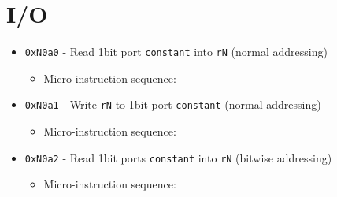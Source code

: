 \documentclass{article}
\def\pkptrout{\Verb|0202| - output *\Verb|pk| to data bus}
\def\incrementpk{\Verb|0502| - increment \Verb|pk|}
\def\regtodata#1{\Verb|#1003| - output \Verb|r#1| to data bus}
\def\datatoreg#1{\Verb|#1403| - write to \Verb|r#1| from data bus}
\def\echodataaddr{\Verb|0021| - echo data bus to addr bus for 3 cycles}
\def\readbitport  {\Verb|00a0| - read 1bit port \Verb|addr| (normal addressing) to the data line}
\def\writebitport {\Verb|00a1| - write data line to 1bit port \Verb|addr| (normal addressing)}
\def\readbitportb {\Verb|00a2| - read 1bit port \Verb|addr| (bitwise addressing) to the data line}
\def\done{\Verb|fffe| - end instruction}
\begin{document}
\section{I/O}
\begin{itemize}
    \item \Verb|0xN0a0| - Read 1bit port \Verb|constant| into \Verb|rN| (normal addressing)
    \begin{itemize}
        \item Micro-instruction sequence:
    \end{itemize}
    
    \item \Verb|0xN0a1| - Write \Verb|rN| to 1bit port \Verb|constant| (normal addressing)
    \begin{itemize}
        \item Micro-instruction sequence:
    \end{itemize}
    
    \item \Verb|0xN0a2| - Read 1bit ports \Verb|constant| into \Verb|rN| (bitwise addressing)
    \begin{itemize}
        \item Micro-instruction sequence:
    \end{itemize}
    

\end{itemize}
\end{document}
